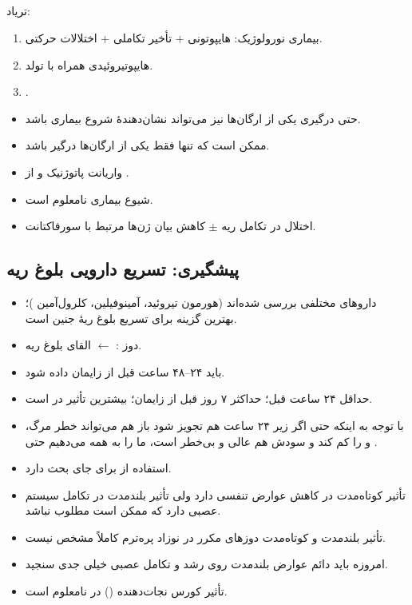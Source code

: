 \documentclass[12pt,a4paper]{article}
\begin{document}
\subsection*{}
تریاد:
\begin{enumerate}
\item بیماری نورولوژیک: هایپوتونی + تأخیر تکاملی + اختلالات حرکتی.
\item هایپوتیروئیدی همراه با تولد.
\item {}.
\end{enumerate}
\begin{itemize}
\item حتی درگیری یکی از ارگان‌ها نیز می‌تواند نشان‌دهندهٔ شروع بیماری باشد.
\item ممکن است که تنها فقط یکی از ارگان‌ها درگیر باشد.
\item واریانت پاتوژنیک و  از .
\item شیوع بیماری نامعلوم است.
\item اختلال در تکامل  ریه $\pm$ کاهش بیان ژن‌ها مرتبط با سورفاکتانت.
\end{itemize}

\subsection*{پیشگیری: تسریع دارویی بلوغ ریه}
\begin{itemize}
\item داروهای مختلفی بررسی شده‌اند (هورمون تیروئید، آمینوفیلین، کلرول‌آمین )؛  بهترین گزینه برای تسریع بلوغ ریهٔ جنین است.
\item دوز :  $\leftarrow$ القای بلوغ ریه.
\item {} باید ۲۴–۴۸ ساعت قبل از زایمان داده شود.
\item حداقل ۲۴ ساعت قبل؛ حداکثر ۷ روز قبل از زایمان؛ بیشترین تأثیر  در  است.
\item با توجه به اینکه  حتی اگر زیر ۲۴ ساعت هم تجویز شود باز هم می‌تواند خطر مرگ،  و  را کم کند و سودش هم عالی و بی‌خطر است، ما  را به همه می‌دهیم حتی .
\item استفاده از  برای  جای بحث دارد.
\item تأثیر کوتاه‌مدت در کاهش عوارض تنفسی دارد ولی تأثیر بلندمدت در تکامل سیستم عصبی دارد که ممکن است مطلوب نباشد.
\item تأثیر بلندمدت و کوتاه‌مدت دوزهای مکرر  در نوزاد پره‌ترم کاملاً مشخص نیست.
\item امروزه باید دائم عوارض بلندمدت روی رشد و تکامل عصبی خیلی جدی سنجید.
\item تأثیر کورس نجات‌دهنده ()  در  نامعلوم است.
\end{itemize}
\end{document}
